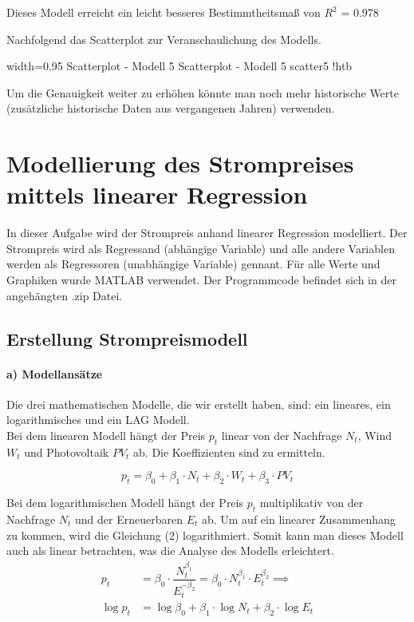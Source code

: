 \documentclass{eegreport}
\begin{document}
Dieses Modell erreicht ein leicht besseres Bestimmtheitsmaß von $R^2$ = 0.978

Nachfolgend das Scatterplot zur Veranschaulichung des Modells.

{width=0.95\textwidth}
{Scatterplot - Modell 5}
{Scatterplot - Modell 5}
{scatter5}
{!htb}

Um die Genauigkeit weiter zu erhöhen könnte man noch mehr historische Werte (zusätzliche historische Daten aus vergangenen Jahren) verwenden.
\newpage
\section{Modellierung des Strompreises mittels linearer Regression}
In dieser Aufgabe wird der Strompreis anhand linearer Regression modelliert. Der Strompreis wird als Regressand (abhängige Variable) und alle andere Variablen werden als Regressoren (unabhängige Variable) gennant. Für alle Werte und Graphiken wurde MATLAB verwendet. Der Programmcode befindet sich in der angehängten .zip Datei.

\subsection{Erstellung Strompreismodell}
\paragraph{a) Modellansätze}\mbox{} \newline\newline
Die drei mathematischen Modelle, die wir erstellt haben, sind: ein lineares, ein logarithmisches und ein LAG Modell. \\

Bei dem linearen Modell hängt der Preis $p_t$ linear von der Nachfrage $N_t$, Wind $W_t$ und Photovoltaik $PV_t$ ab. Die Koeffizienten sind zu ermitteln.

\begin{equation}
p_t = \beta_0 + \beta_1 \cdot N_t + \beta_2 \cdot W_t + \beta_3 \cdot PV_t
\end{equation}

Bei dem logarithmischen Modell hängt der Preis $p_t$ multiplikativ von der Nachfrage $N_t$ und der Erneuerbaren $E_t$ ab. Um auf ein linearer Zusammenhang zu kommen, wird die Gleichung (2) logarithmiert. Somit kann man dieses Modell auch als linear betrachten, was die Analyse des Modells erleichtert.
\begin{align}
p_t &= \beta_0 \cdot \dfrac{N_t^{\beta_1}}{E_t^{-\beta_2}} = \beta_0 \cdot N_t^{\beta_1} \cdot E_t^{\beta_2}\implies\\
\log{p_t} &= \log{\beta_0} + \beta_1 \cdot \log{N_t} + \beta_2 \cdot \log{E_t}
\end{align}
\end{document}
